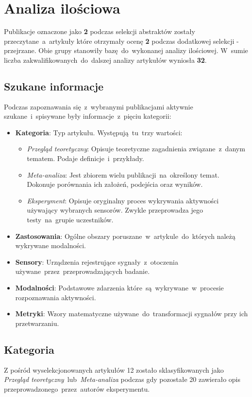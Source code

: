 \section{Analiza ilościowa}
Publikacje oznaczone jako {\bf 2} podczas selekcji abstraktów zostały przeczytane~a~artykuły które otrzymały ocenę {\bf 2} podczas dodatkowej selekcji - przejrzane. Obie grupy stanowiły bazę~do~wykonanej analizy ilościowej. W~sumie liczba zakwalifikowanych~do~dalszej analizy artykułów wyniosła {\bf 32}.

\subsection{Szukane informacje}
Podczas zapoznawania się~z~wybranymi publikacjami aktywnie szukane~i~spisywane były informacje~z~pięciu kategorii:
\begin{itemize}
    \item {\bf Kategoria}: Typ artykułu. Występują~tu~trzy wartości:
    \begin{itemize}
		\item {\it Przegląd teoretyczny}: Opisuje teoretyczne zagadnienia związane~z~danym tematem. Podaje definicje~i~przykłady.
		\item {\it Meta-analiza}: Jest zbiorem wielu publikacji~na~określony temat. Dokonuje porównania ich założeń, podejścia oraz wyników.
		\item {\it Eksperyment}: Opisuje oryginalny proces wykrywania aktywności używający wybranych sensorów. Zwykle przeprowadza jego testy~na~grupie uczestników.
	\end{itemize}
    \item {\bf Zastosowania}: Ogólne obszary poruszane~w~artykule~do~których należą wykrywane modalności.
    \item {\bf Sensory}: Urządzenia rejestrujące sygnały~z~otoczenia używane~przez~przeprowadzających badanie.
    \item {\bf Modalności}: Podstawowe zdarzenia które~są~wykrywane~w~procesie rozpoznawania aktywności.
    \item {\bf Metryki}: Wzory matematyczne używane~do~transformacji sygnałów przy ich przetwarzaniu.
\end{itemize}

\subsection{Kategoria}
Z pośród wyselekcjonowanych artykułów 12 zostało sklasyfikowanych jako \textit{Przegląd teoretyczny}~lub~\textit{Meta-analiza} podczas gdy pozostałe 20 zawierało opis przeprowadzonego~przez~autorów eksperymentu. 

